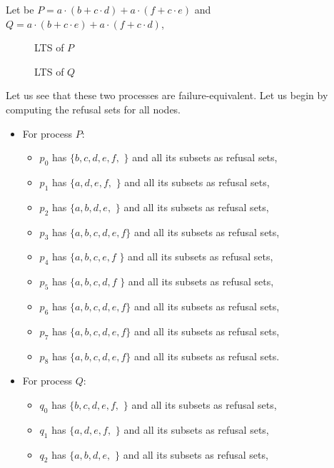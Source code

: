 \documentclass[11pt]{article}
\newcommand{\cmark}{\ding{51}}
\theoremstyle{definition}
\theoremstyle{plain}
\begin{document}
Let be $ P = a\cdot (b + c\cdot d) + a\cdot (f+c\cdot e) $ and $ Q = a\cdot (b + c\cdot e) + a\cdot (f + c\cdot d) $,

\begin{figure} [H]
	\centering
	
	\caption{LTS of $P$} \label{fig:FailureEquivalenceP}
	\endminipage\hfill
	\centering
	
	\caption{LTS of $Q$} \label{fig:FailureEquivalenceQ}
	\endminipage\hfill
\end{figure}

Let us see that these two processes are failure-equivalent. Let us begin by computing the refusal sets for all nodes.

\begin{itemize}
	\item For process $ P $:
	\begin{itemize}
		\item $ p_0 $ has $ \{b, c, d, e, f, $ \cmark $\} $ and all its subsets as refusal sets,
		\item $ p_1 $ has $ \{a, d, e, f, $ \cmark $\} $ and all its subsets as refusal sets,
		\item $ p_2 $ has $ \{a, b, d, e, $ \cmark $\} $ and all its subsets as refusal sets,
		\item $ p_3 $ has $ \{a, b, c, d, e, f\} $ and all its subsets as refusal sets,
		\item $ p_4 $ has $ \{a, b, c, e, f$ \cmark $\} $ and all its subsets as refusal sets,
		\item $ p_5 $ has $ \{a, b, c, d, f$ \cmark $\} $ and all its subsets as refusal sets,
		\item $ p_6 $ has $ \{a, b, c, d, e, f\} $ and all its subsets as refusal sets,
		\item $ p_7 $ has $ \{a, b, c, d, e, f\} $ and all its subsets as refusal sets,
		\item $ p_8 $ has $ \{a, b, c, d, e, f\} $ and all its subsets as refusal sets.
	\end{itemize}
	\item For process $ Q $:
	\begin{itemize}
		\item $ q_0 $ has $ \{b, c, d, e, f, $ \cmark $\} $ and all its subsets as refusal sets,
		\item $ q_1 $ has $ \{a, d, e, f, $ \cmark $\} $ and all its subsets as refusal sets,
		\item $ q_2 $ has $ \{a, b, d, e, $ \cmark $\} $ and all its subsets as refusal sets,

\end{itemize}
\end{itemize}
\end{document}
